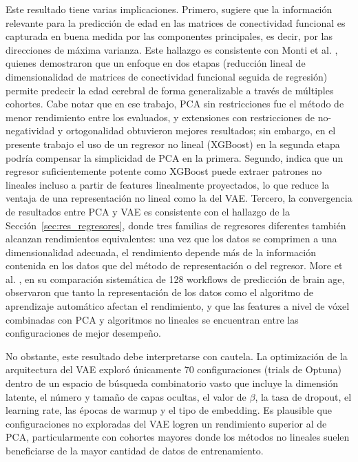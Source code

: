Este resultado tiene varias implicaciones. Primero, sugiere que la información relevante para la predicción de edad en las matrices de conectividad funcional es capturada en buena medida por las componentes principales, es decir, por las direcciones de máxima varianza. Este hallazgo es consistente con Monti et al. \cite{monti2020interpretable}, quienes demostraron que un enfoque en dos etapas (reducción lineal de dimensionalidad de matrices de conectividad funcional seguida de regresión) permite predecir la edad cerebral de forma generalizable a través de múltiples cohortes. Cabe notar que en ese trabajo, PCA sin restricciones fue el método de menor rendimiento entre los evaluados, y extensiones con restricciones de no-negatividad y ortogonalidad obtuvieron mejores resultados; sin embargo, en el presente trabajo el uso de un regresor no lineal (XGBoost) en la segunda etapa podría compensar la simplicidad de PCA en la primera. Segundo, indica que un regresor suficientemente potente como XGBoost puede extraer patrones no lineales incluso a partir de features linealmente proyectados, lo que reduce la ventaja de una representación no lineal como la del VAE. Tercero, la convergencia de resultados entre PCA y VAE es consistente con el hallazgo de la Sección~\ref{sec:res_regresores}, donde tres familias de regresores diferentes también alcanzan rendimientos equivalentes: una vez que los datos se comprimen a una dimensionalidad adecuada, el rendimiento depende más de la información contenida en los datos que del método de representación o del regresor. More et al. \cite{more2023brain}, en su comparación sistemática de 128 workflows de predicción de brain age, observaron que tanto la representación de los datos como el algoritmo de aprendizaje automático afectan el rendimiento, y que las features a nivel de vóxel combinadas con PCA y algoritmos no lineales se encuentran entre las configuraciones de mejor desempeño.

No obstante, este resultado debe interpretarse con cautela. La optimización de la arquitectura del VAE exploró únicamente 70 configuraciones (trials de Optuna) dentro de un espacio de búsqueda combinatorio vasto que incluye la dimensión latente, el número y tamaño de capas ocultas, el valor de $\beta$, la tasa de dropout, el learning rate, las épocas de warmup y el tipo de embedding. Es plausible que configuraciones no exploradas del VAE logren un rendimiento superior al de PCA, particularmente con cohortes mayores donde los métodos no lineales suelen beneficiarse de la mayor cantidad de datos de entrenamiento.

